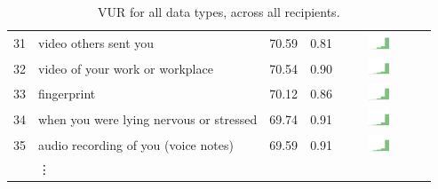\begin{table}[t]
\begin{center}
\begin{tabular}{| r | l | r | r | r | r |}
31 & video others sent you & 70.59 & 0.81 & \includegraphics[width = 2cm, height = 0.5cm]{tex-inputs/table-images/sharedvideosotherssentyousavedonyourdevicecombined} \\ 
32 & video of your work or workplace & 70.54 & 0.90 & \includegraphics[width = 2cm, height = 0.5cm]{tex-inputs/table-images/tookvideosatwork(withanoutward-facingcamera)combined} \\ 
33 & fingerprint & 70.12 & 0.86 & \includegraphics[width = 2cm, height = 0.5cm]{tex-inputs/table-images/learnedyourfingerprintsomehowcombined} \\ 
34 & when you were lying nervous or stressed & 69.74 & 0.91 & \includegraphics[width = 2cm, height = 0.5cm]{tex-inputs/table-images/learnedwhenyouwerelyingnervousorstressedcombined} \\ 
35 & audio recording of you (voice notes) & 69.59 & 0.91 & \includegraphics[width = 2cm, height = 0.5cm]{tex-inputs/table-images/recordedyoutalkingtoyourself(makingvoicenotes)combined} \\ 
& \vdots & & & \\
\hline
\end{tabular}
\caption{VUR for all data types, across all recipients.}
\label{full-vur-table}
\end{center}
\end{table}

